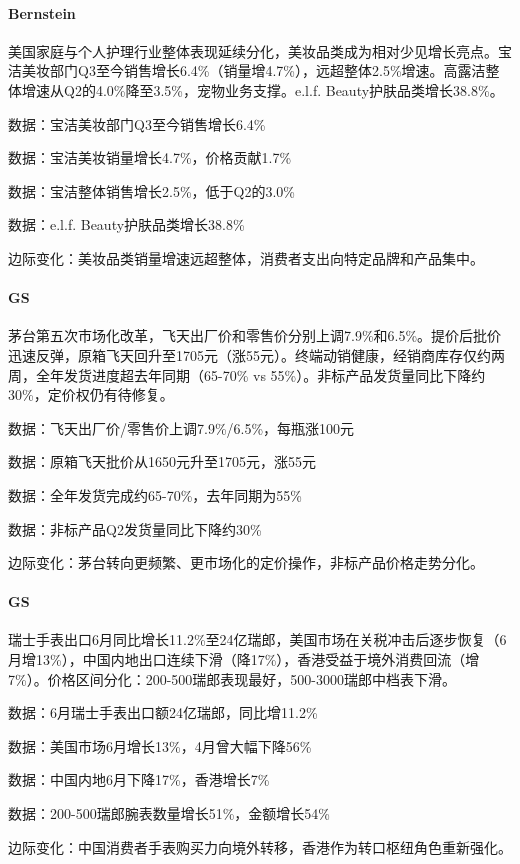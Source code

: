 \documentclass[11pt]{ctexart}
\begin{document}
\paragraph{Bernstein} 美国家庭与个人护理行业整体表现延续分化，美妆品类成为相对少见增长亮点。宝洁美妆部门Q3至今销售增长6.4\%（销量增4.7\%），远超整体2.5\%增速。高露洁整体增速从Q2的4.0\%降至3.5\%，宠物业务支撑。e.l.f. Beauty护肤品类增长38.8\%。
{\small\color{refgray}数据：宝洁美妆部门Q3至今销售增长6.4\%\par}
{\small\color{refgray}数据：宝洁美妆销量增长4.7\%，价格贡献1.7\%\par}
{\small\color{refgray}数据：宝洁整体销售增长2.5\%，低于Q2的3.0\%\par}
{\small\color{refgray}数据：e.l.f. Beauty护肤品类增长38.8\%\par}
{\small\color{refgray}边际变化：美妆品类销量增速远超整体，消费者支出向特定品牌和产品集中。\par}
\paragraph{GS} 茅台第五次市场化改革，飞天出厂价和零售价分别上调7.9\%和6.5\%。提价后批价迅速反弹，原箱飞天回升至1705元（涨55元）。终端动销健康，经销商库存仅约两周，全年发货进度超去年同期（65-70\% vs 55\%）。非标产品发货量同比下降约30\%，定价权仍有待修复。
{\small\color{refgray}数据：飞天出厂价/零售价上调7.9\%/6.5\%，每瓶涨100元\par}
{\small\color{refgray}数据：原箱飞天批价从1650元升至1705元，涨55元\par}
{\small\color{refgray}数据：全年发货完成约65-70\%，去年同期为55\%\par}
{\small\color{refgray}数据：非标产品Q2发货量同比下降约30\%\par}
{\small\color{refgray}边际变化：茅台转向更频繁、更市场化的定价操作，非标产品价格走势分化。\par}
\paragraph{GS} 瑞士手表出口6月同比增长11.2\%至24亿瑞郎，美国市场在关税冲击后逐步恢复（6月增13\%），中国内地出口连续下滑（降17\%），香港受益于境外消费回流（增7\%）。价格区间分化：200-500瑞郎表现最好，500-3000瑞郎中档表下滑。
{\small\color{refgray}数据：6月瑞士手表出口额24亿瑞郎，同比增11.2\%\par}
{\small\color{refgray}数据：美国市场6月增长13\%，4月曾大幅下降56\%\par}
{\small\color{refgray}数据：中国内地6月下降17\%，香港增长7\%\par}
{\small\color{refgray}数据：200-500瑞郎腕表数量增长51\%，金额增长54\%\par}
{\small\color{refgray}边际变化：中国消费者手表购买力向境外转移，香港作为转口枢纽角色重新强化。\par}
\end{document}
